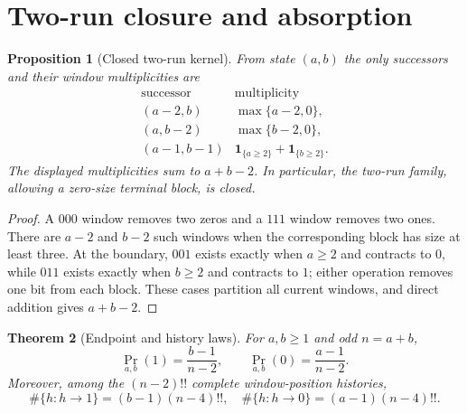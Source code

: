 \documentclass[10pt,a4paper]{amsart}
\newtheorem{theorem}{Theorem}[section]
\newtheorem{proposition}[theorem]{Proposition}
\theoremstyle{remark}
\newcommand{\1}{\mathbf 1}
\begin{document}
\section{Two-run closure and absorption}

\begin{proposition}[Closed two-run kernel]\label{prop:kernel}
From state $(a,b)$ the only successors and their window multiplicities are
\begin{equation}\label{eq:kernel}
\begin{array}{c|c}
\text{successor}&\text{multiplicity}\\ \hline
(a-2,b)&\max\{a-2,0\},\\
(a,b-2)&\max\{b-2,0\},\\
(a-1,b-1)&\1_{\{a\geq2\}}+\1_{\{b\geq2\}}.
\end{array}
\end{equation}
The displayed multiplicities sum to $a+b-2$.  In particular, the two-run
family, allowing a zero-size terminal block, is closed.
\end{proposition}

\begin{proof}
A $000$ window removes two zeros and a $111$ window removes two ones.  There
are $a-2$ and $b-2$ such windows when the corresponding block has size at
least three.  At the boundary, $001$ exists exactly when $a\geq2$ and contracts
to $0$, while $011$ exists exactly when $b\geq2$ and contracts to $1$; either
operation removes one bit from each block.  These cases partition all current
windows, and direct addition gives $a+b-2$.
\end{proof}

\begin{theorem}[Endpoint and history laws]\label{thm:endpoint}
For $a,b\geq1$ and odd $n=a+b$,
\begin{equation}\label{eq:endpoint}
 \Pr_{a,b}(1)=\frac{b-1}{n-2},\qquad
 \Pr_{a,b}(0)=\frac{a-1}{n-2}.
\end{equation}
Moreover, among the $(n-2)!!$ complete window-position histories,
\begin{equation}\label{eq:history-counts}
 \#\{h:h\to1\}=(b-1)(n-4)!!,
 \quad
 \#\{h:h\to0\}=(a-1)(n-4)!!.
\end{equation}
\end{theorem}
\end{document}
